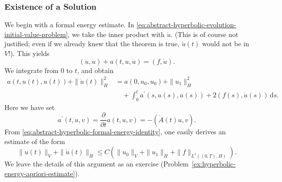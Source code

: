 \subsubsection{Existence of a Solution}\label{subsec:hyperbolic-solution-existence}

We begin with a formal energy estimate. In \eqref{eq:abstract-hyperbolic-evolution-initial-value-problem}, we take the inner product with $\dot u$. (This is of course not justified; even if we already knew that the theorem is true, $\dot u(t)$ would not be in $V$!). This yields
\begin{equation}\label{eq:abstract-hyperbolic-formal-energy-pairing}
(\ddot u,\dot u)+a(t,u,\dot u)=(f,\dot u).
\end{equation}
We integrate from 0 to $t$, and obtain
\begin{equation}\label{eq:abstract-hyperbolic-formal-energy-identity}
\begin{aligned}a(t,u(t),u(t))+\|\dot u(t)\|_H^2&=a(0,u_0,u_0)+\|u_1\|_H^2\\&\quad+\int_0^t a^{\prime}(s,u(s),u(s))+2(f(s),\dot u(s))\,\mathrm{d}s.\end{aligned}
\end{equation}
Here we have set
\begin{equation}\label{eq:abstract-hyperbolic-time-derivative-quadratic-form}
a^{\prime}(t,u,v)=\dfrac{\partial}{\partial t}a(t,u,v)=-(\dot A(t)u,v).
\end{equation}
From \eqref{eq:abstract-hyperbolic-formal-energy-identity}, one easily derives an estimate of the form
\begin{equation}\label{eq:abstract-hyperbolic-solution-apriori-bound}
\|u(t)\|_V+\|\dot u(t)\|_H\leq C(\|u_0\|_V+\|u_1\|_H+\|f\|_{L^1((0,T),H)}).
\end{equation}
We leave the details of this argument as an exercise (Problem~\ref{ex:hyperbolic-energy-apriori-estimate}).

